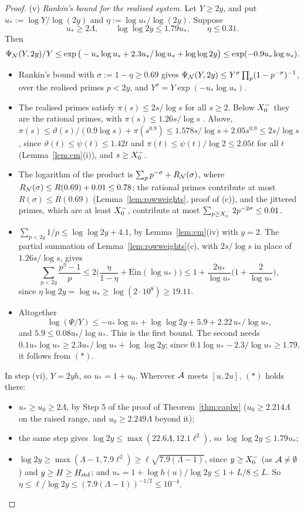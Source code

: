 \begin{proof}
(v) \emph{Rankin's bound for the realised system.} Let $Y\ge2y$, and put $u_*:=\log Y/\log(2y)$ and
$\eta:=\log u_*/\log(2y)$. Suppose
\[
u_*\ge2\Lambda,\qquad\log\log2y\le1.79u_*,\qquad\eta\le0.31.\tag{$*$}
\]
Then
\[
\Psi_{\mathcal{N}}(Y,2y)/Y\le\exp\big(-u_*\log u_*+2.3u_*/\log u_*+\log\log2y\big)\le\exp(-0.9u_*\log u_*).
\]
\begin{itemize}
\item Rankin's bound with $\sigma:=1-\eta\ge0.69$ gives $\Psi_{\mathcal{N}}(Y,2y)\le Y^{\sigma}\prod_p(1-p^{-\sigma})^{-1}$, over the
  realised primes $p<2y$, and $Y^{\sigma}=Y\exp(-u_*\log u_*)$.
\item The realised primes satisfy $\pi(s)\le2s/\log s$ for all $s\ge2$. Below $X_0^{-}$ they are the rational primes, with
  $\pi(s)\le1.26s/\log s$ \cite[(3.6)]{RosserSchoenfeld1962}. Above, $\pi(s)\le\vartheta(s)/(0.9\log s)+\pi(s^{0.9})\le1.578s/\log s+2.05s^{0.9}\le2s/\log s$, since
  $\vartheta(t)\le\psi(t)\le1.42t$ and $\pi(t)\le\psi(t)/\log2\le2.05t$ for all $t$ (Lemma~\ref{lem:cm}(i)), and $s\ge X_0^{-}$.
\item The logarithm of the product is $\sum_pp^{-\sigma}+R_{\mathcal{N}}(\sigma)$, where $R_{\mathcal{N}}(\sigma)\le R(0.69)+0.01\le0.78$: the
  rational primes contribute at most $R(\sigma)\le R(0.69)$ (Lemma~\ref{lem:rowweights}, proof of (c)), and the jittered
  primes, which are at least $X_0^{-}$, contribute at most $\sum_{p\ge X_0^{-}}2p^{-2\sigma}\le0.01$.
\item $\sum_{p<2y}1/p\le\log\log2y+4.1$, by Lemma~\ref{lem:cm}(iv) with $y=2$. The partial summation of
  Lemma~\ref{lem:rowweights}(c), with $2s/\log s$ in place of $1.26s/\log s$, gives
  \[
  \sum_{p<2y}\frac{p^{\eta}-1}p\le2\Big(\frac{\eta}{1-\eta}+\mathrm{Ein}(\log u_*)\Big)\le1+\frac{2u_*}{\log u_*}\Big(1+\frac2{\log u_*}\Big),
  \]
  since $\eta\log2y=\log u_*\ge\log(2\cdot10^8)\ge19.11$.
\item Altogether
  \[
  \log(\Psi/Y)\le-u_*\log u_*+\log\log2y+5.9+2.22\,u_*/\log u_*,
  \]
  and $5.9\le0.08u_*/\log u_*$. This is the first bound. The second needs $0.1u_*\log u_*\ge2.3u_*/\log u_*+\log\log2y$; since $0.1\log u_*-2.3/\log u_*\ge1.79$, it
  follows from $(*)$.
\end{itemize}
In step (vi), $Y=2yh$, so $u_*=1+u_0$. Wherever $\mathcal{A}$ meets $[u,2u]$, $(*)$ holds there:
\begin{itemize}
\item $u_*\ge u_0\ge2\Lambda$, by Step 5 of the proof of Theorem~\ref{thm:caplw} ($u_0\ge2.214\Lambda$ on the raised range, and
  $u_0\ge2.249\Lambda$ beyond it);
\item the same step gives $\log2y\le\max(22.6\Lambda,12.1\ell^2)$, so $\log\log2y\le1.79u_*$;
\item $\log2y\ge\max(\Lambda-1,7.9\ell^2)\ge\ell\sqrt{7.9(\Lambda-1)}$, since $y\ge X_0^{-}$ (as $\mathcal{A}\ne\emptyset$) and $y\ge H\ge H_{\mathrm{std}}$;
  and $u_*=1+\log h(u)/\log2y\le1+L/8\le L$. So $\eta\le\ell/\log2y\le(7.9(\Lambda-1))^{-1/2}\le10^{-4}$.
\end{itemize}


\end{proof}
